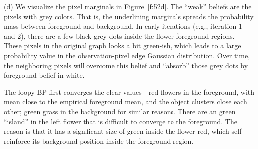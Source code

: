 \documentclass{article}
\begin{document}
\noindent
(d) We visualize the pixel marginals in Figure~\ref{f:52d}.
%
The ``weak'' beliefs are the pixels with grey colors. That is, the underlining
marginals spreads the probability mass between foreground and background.
%
In early iterations (e.g., iteration 1 and 2), there are a few black-grey dots inside
the flower foreground regions. These pixels in the original graph looks a bit green-ish,
which leads to a large probability value in the observation-pixel edge Gaussian
distribution. Over time, the neighboring pixels will overcome this belief and ``absorb''
those grey dots by foreground belief in white.
%

The loopy BP first converges the clear values---red flowers in the foreground, with mean 
close to the empirical foreground mean, and the object clusters close each other; green 
grass in the background for similar reasons. There are an green ``island'' in the left
flower that is difficult to converge to the foreground. The reason is that it has a
significant size of green inside the flower red, which self-reinforce its background
position inside the foreground region.
%
\end{document}
